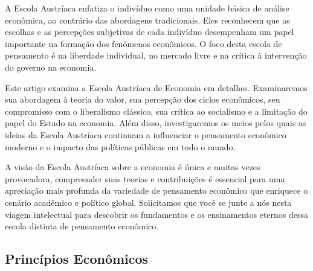 \documentclass[a4paper,12pt]{article}
\begin{document}
A Escola Austríaca enfatiza o indivíduo como uma unidade básica de análise econômica, ao contrário 
das abordagens tradicionais. Eles reconhecem que as escolhas e as percepções subjetivas de cada indivíduo 
desempenham um papel importante na formação dos fenômenos econômicos. O foco desta escola de pensamento 
é na liberdade individual, no mercado livre e na crítica à intervenção do governo na economia.

Este artigo examina a Escola Austríaca de Economia em detalhes. Examinaremos sua abordagem à teoria do valor,
sua percepção dos ciclos econômicos, seu compromisso com o liberalismo clássico, sua crítica ao socialismo e
a limitação do papel do Estado na economia. Além disso, investigaremos os meios pelos quais as ideias da Escola 
Austríaca continuam a influenciar o pensamento econômico moderno e o impacto das políticas públicas em todo o 
mundo.

A visão da Escola Austríaca sobre a economia é única e muitas vezes provocadora, compreender suas teorias e 
contribuições é essencial para uma apreciação mais profunda da variedade de pensamento econômico que enriquece 
o cenário acadêmico e político global. Solicitamos que você se junte a nós nesta viagem intelectual para descobrir 
os fundamentos e os ensinamentos eternos dessa escola distinta de pensamento econômico.

\subsection{Princ\'ipios Econ\^omicos}
\end{document}
